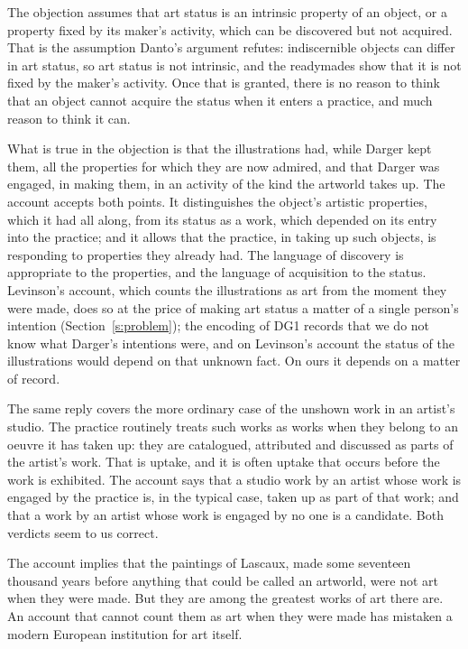 \documentclass{situationist-preprint}
\begin{document}
\begin{reply}
The objection assumes that art status is an intrinsic property of an object, or a property fixed by its maker's activity, which can be discovered but not acquired. That is the assumption Danto's argument refutes: indiscernible objects can differ in art status, so art status is not intrinsic, and the readymades show that it is not fixed by the maker's activity. Once that is granted, there is no reason to think that an object cannot acquire the status when it enters a practice, and much reason to think it can.

What is true in the objection is that the illustrations had, while Darger kept them, all the properties for which they are now admired, and that Darger was engaged, in making them, in an activity of the kind the artworld takes up. The account accepts both points. It distinguishes the object's artistic properties, which it had all along, from its status as a work, which depended on its entry into the practice; and it allows that the practice, in taking up such objects, is responding to properties they already had. The language of discovery is appropriate to the properties, and the language of acquisition to the status. Levinson's account, which counts the illustrations as art from the moment they were made, does so at the price of making art status a matter of a single person's intention (Section~\ref{s:problem}); the encoding of DG1 records that we do not know what Darger's intentions were, and on Levinson's account the status of the illustrations would depend on that unknown fact. On ours it depends on a matter of record.

The same reply covers the more ordinary case of the unshown work in an artist's studio. The practice routinely treats such works as works when they belong to an oeuvre it has taken up: they are catalogued, attributed and discussed as parts of the artist's work. That is uptake, and it is often uptake that occurs before the work is exhibited. The account says that a studio work by an artist whose work is engaged by the practice is, in the typical case, taken up as part of that work; and that a work by an artist whose work is engaged by no one is a candidate. Both verdicts seem to us correct.
\end{reply}

\begin{objection}\label{o:before}
The account implies that the paintings of Lascaux, made some seventeen thousand years before anything that could be called an artworld, were not art when they were made. But they are among the greatest works of art there are. An account that cannot count them as art when they were made has mistaken a modern European institution for art itself.
\end{objection}
\end{document}
